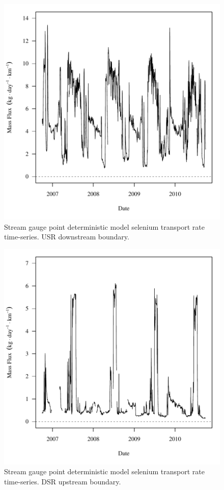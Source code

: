 \begin{figure}[htbp]
	\begin{center}
	\includegraphics[width=6in]{"Figures/Results_DUSR/f U201"}
	\caption{Stream gauge point deterministic model selenium transport rate time-series.  USR downstream boundary.}
	\end{center}
\end{figure}
\newpage

\begin{figure}[htbp]
	\begin{center}
	\includegraphics[width=6in]{"Figures/Results_DDSR/f D101C"}
	\caption{Stream gauge point deterministic model selenium transport rate time-series.  DSR upstream boundary.}
	\end{center}
\end{figure}
\newpage


